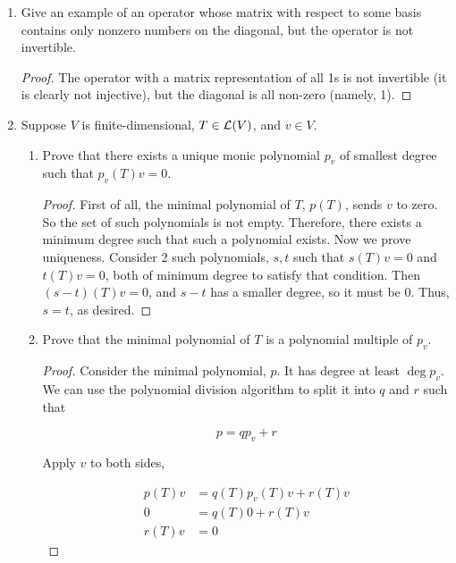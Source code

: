 \begin{enumerate}
\begin{proof}
    The cyclic shift operator is such an operator. Given a basis of $V$, $v_0, \dots, v_{n-1}$, the shift operator, $T$, has $Tv_i = v_{i + 1 \pmod{n}}$
\end{proof}
    
\item[5] Give an example of an operator whose matrix with respect to some basis
contains only nonzero numbers on the diagonal, but the operator is not
invertible.

\begin{proof}
    The operator with a matrix representation of all 1s is not invertible (it is clearly not injective), but the diagonal is all non-zero (namely, 1).
\end{proof}

\item[7] Suppose $V$ is finite-dimensional, $T \in \mathcal L(V)$, and $v \in V$. 

\begin{enumerate}
    \item Prove that there exists a unique monic polynomial $p_v$ of smallest degree such that $p_v(T)v = 0$.
    
    \begin{proof}
        First of all, the minimal polynomial of $T$, $p(T)$, sends $v$ to zero. So the set of such polynomials is not empty. Therefore, there exists a minimum degree such that such a polynomial exists. Now we prove uniqueness. Consider 2 such polynomials, $s, t$ such that $s(T)v = 0$ and $t(T)v = 0$, both of minimum degree to satisfy that condition. Then $(s - t)(T)v = 0$, and $s - t$ has a smaller degree, so it must be 0. Thus, $s = t$, as desired.
    \end{proof}
    
    \item Prove that the minimal polynomial of $T$ is a polynomial multiple of $p_v$.
    
    \begin{proof}
        Consider the minimal polynomial, $p$. It has degree at least $\deg p_v$. We can use the polynomial division algorithm to split it into $q$ and $r$ such that 

        $$p = qp_v + r$$

        Apply $v$ to both sides, 

        \begin{align*}
            p(T)v &= q(T)p_v(T)v + r(T)v \\
            0 &= q(T)0 + r(T)v \\
            r(T)v &= 0 
        \end{align*}


\end{proof}
\end{enumerate}
\end{enumerate}
